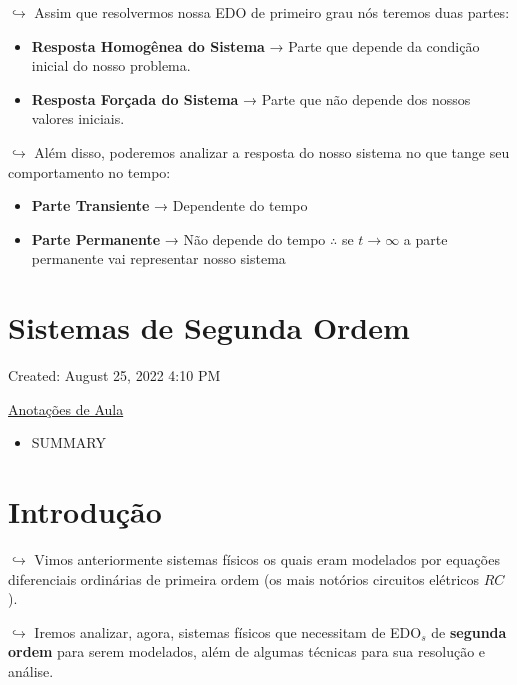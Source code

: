 \documentclass{article}
\begin{document}
\begin{itemize}
\(\hookrightarrow\) Assim que resolvermos nossa EDO de primeiro grau nós
teremos duas partes:

\begin{itemize}
\tightlist
\item
  \textbf{Resposta Homogênea do Sistema} → Parte que depende da condição
  inicial do nosso problema.
\item
  \textbf{Resposta Forçada do Sistema} → Parte que não depende dos
  nossos valores iniciais.
\end{itemize}

\(\hookrightarrow\) Além disso, poderemos analizar a resposta do nosso
sistema no que tange seu comportamento no tempo:

\begin{itemize}
\tightlist
\item
  \textbf{Parte Transiente} → Dependente do tempo
\item
  \textbf{Parte Permanente} → Não depende do tempo \(\therefore\) se
  \(t \rightarrow \infty\) a parte permanente vai representar nosso
  sistema
\end{itemize}

\hypertarget{sistemas-de-segunda-ordem}{%
\section{Sistemas de Segunda Ordem}\label{sistemas-de-segunda-ordem}}

Created: August 25, 2022 4:10 PM

\href{Sistemas\%20de\%20Segunda\%20Ordem\%207cce407b38fb4322a04efbceb4baea55/Anotac\%CC\%A7o\%CC\%83es\%20de\%20Aula\%20f1f42d977d6e4b859d420fff2fed867d.md}{Anotações
de Aula}

\begin{itemize}
\tightlist
\item
  SUMMARY
\end{itemize}

\hypertarget{introduuxe7uxe3o-2}{%
\section{Introdução}\label{introduuxe7uxe3o-2}}

\(\hookrightarrow\) Vimos anteriormente sistemas físicos os quais eram
modelados por equações diferenciais ordinárias de primeira ordem (os
mais notórios circuitos elétricos \(RC\)).

\(\hookrightarrow\) Iremos analizar, agora, sistemas físicos que
necessitam de EDO\(_s\) de \textbf{segunda ordem} para serem modelados,
além de algumas técnicas para sua resolução e análise.


\end{itemize}
\end{document}
